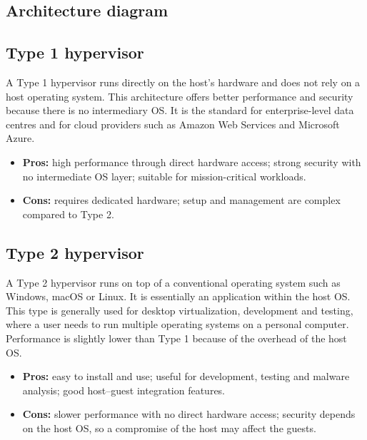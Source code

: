 \documentclass[11pt,a4paper]{article}
\begin{document}
\subsection{Architecture diagram}

\subsection{Type 1 hypervisor}

A Type 1 hypervisor runs directly on the host's hardware and does not rely on a host
operating system. This architecture offers better performance and security because there is
no intermediary OS. It is the standard for enterprise-level data centres and for cloud
providers such as Amazon Web Services and Microsoft Azure.


\begin{itemize}\itemsep2pt
  \item \textbf{Pros:} high performance through direct hardware access; strong security with
        no intermediate OS layer; suitable for mission-critical workloads.
  \item \textbf{Cons:} requires dedicated hardware; setup and management are complex compared
        to Type 2.
\end{itemize}

\subsection{Type 2 hypervisor}

A Type 2 hypervisor runs on top of a conventional operating system such as Windows, macOS or
Linux. It is essentially an application within the host OS. This type is generally used for
desktop virtualization, development and testing, where a user needs to run multiple operating
systems on a personal computer. Performance is slightly lower than Type 1 because of the
overhead of the host OS.


\begin{itemize}\itemsep2pt
  \item \textbf{Pros:} easy to install and use; useful for development, testing and malware
        analysis; good host--guest integration features.
  \item \textbf{Cons:} slower performance with no direct hardware access; security depends on
        the host OS, so a compromise of the host may affect the guests.
\end{itemize}
\end{document}
